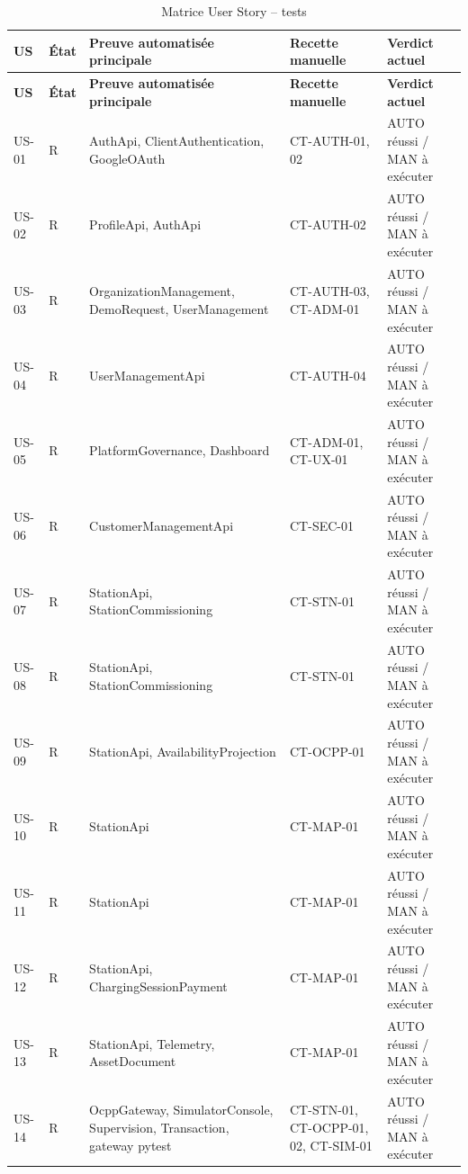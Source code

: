 \begingroup
\scriptsize
\setlength{\tabcolsep}{3pt}
\renewcommand{\arraystretch}{1.10}
\begin{longtable}{|C{1.15cm}|C{1.05cm}|L{5.6cm}|L{3.9cm}|L{3.1cm}|}
\caption{Matrice User Story -- tests}\label{tab:traceability}\\
\hline
{}\textbf{US} & \textbf{État} & \textbf{Preuve automatisée principale} & \textbf{Recette manuelle} & \textbf{Verdict actuel} \\ \hline
\endfirsthead
\hline
{}\textbf{US} & \textbf{État} & \textbf{Preuve automatisée principale} & \textbf{Recette manuelle} & \textbf{Verdict actuel} \\ \hline
\endhead
US-01 & R & AuthApi, ClientAuthentication, GoogleOAuth & CT-AUTH-01, 02 & AUTO réussi / MAN à exécuter \\ \hline
US-02 & R & ProfileApi, AuthApi & CT-AUTH-02 & AUTO réussi / MAN à exécuter \\ \hline
US-03 & R & OrganizationManagement, DemoRequest, UserManagement & CT-AUTH-03, CT-ADM-01 & AUTO réussi / MAN à exécuter \\ \hline
US-04 & R & UserManagementApi & CT-AUTH-04 & AUTO réussi / MAN à exécuter \\ \hline
US-05 & R & PlatformGovernance, Dashboard & CT-ADM-01, CT-UX-01 & AUTO réussi / MAN à exécuter \\ \hline
US-06 & R & CustomerManagementApi & CT-SEC-01 & AUTO réussi / MAN à exécuter \\ \hline
US-07 & R & StationApi, StationCommissioning & CT-STN-01 & AUTO réussi / MAN à exécuter \\ \hline
US-08 & R & StationApi, StationCommissioning & CT-STN-01 & AUTO réussi / MAN à exécuter \\ \hline
US-09 & R & StationApi, AvailabilityProjection & CT-OCPP-01 & AUTO réussi / MAN à exécuter \\ \hline
US-10 & R & StationApi & CT-MAP-01 & AUTO réussi / MAN à exécuter \\ \hline
US-11 & R & StationApi & CT-MAP-01 & AUTO réussi / MAN à exécuter \\ \hline
US-12 & R & StationApi, ChargingSessionPayment & CT-MAP-01 & AUTO réussi / MAN à exécuter \\ \hline
US-13 & R & StationApi, Telemetry, AssetDocument & CT-MAP-01 & AUTO réussi / MAN à exécuter \\ \hline
US-14 & R & OcppGateway, SimulatorConsole, Supervision, Transaction, gateway pytest & CT-STN-01, CT-OCPP-01, 02, CT-SIM-01 & AUTO réussi / MAN à exécuter \\ \hline

\end{longtable}
